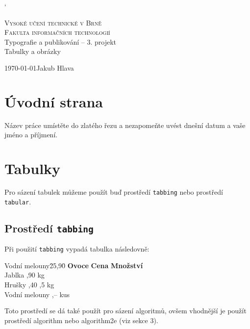 \documentclass[11pt, a4paper]{article}
\begin{document}
\catcode` %

\begin{titlepage}
\begin{center}
    \Huge
    \textsc{Vysoké učení technické v Brně}\\
    \huge
    \textsc{Fakulta informačních technologií}\\
    \LARGE
    Typografie a publikování -- 3. projekt\\
    \Huge
    Tabulky a obrázky
\end{center}
{\Large \today \hfill Jakub Hlava}
\end{titlepage}
\newpage

\section{Úvodní strana}
Název práce umístěte do zlatého řezu a nezapomeňte uvést dnešní datum a vaše jméno a příjmení.
\section{Tabulky}
Pro sázení tabulek můžeme použít buď prostředí \texttt{tabbing} nebo prostředí \texttt{tabular}.
\subsection{Prostředí \texttt{tabbing}}
Při použití \texttt{tabbing} vypadá tabulka následovně:
\begin{tabbing}
Vodní melouny\quad \= 25,90\quad \= \kill
\textbf{Ovoce} \> \textbf{Cena} \>  \textbf{Množství} \\
Jablka ,90  kg \\
Hrušky ,40 ,5 kg \\
Vodní melouny ,--  kus
\end{tabbing}
\vspace{1em}
Toto prostředí se dá také použít pro sázení algoritmů, ovšem vhodnější je použít 
prostředí algorithm nebo algorithm2e (viz sekce 3). %
\end{document}

